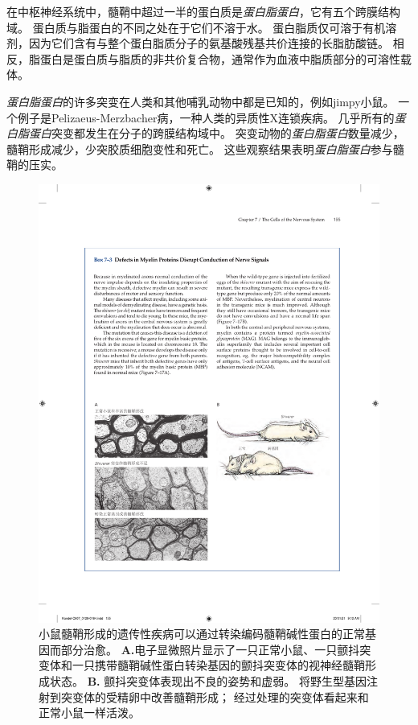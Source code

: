 \begin{proposition}[髓鞘蛋白缺陷破坏神经信号传导]
	\quad \quad 在中枢神经系统中，髓鞘中超过一半的蛋白质是\textit{蛋白脂蛋白}，它有五个跨膜结构域。
	蛋白质与脂蛋白的不同之处在于它们不溶于水。
	蛋白脂质仅可溶于有机溶剂，因为它们含有与整个蛋白脂质分子的氨基酸残基共价连接的长脂肪酸链。
	相反，脂蛋白是蛋白质与脂质的非共价复合物，通常作为血液中脂质部分的可溶性载体。
	
	\quad \quad \textit{蛋白脂蛋白}的许多突变在人类和其他哺乳动物中都是已知的，例如jimpy小鼠。
	一个例子是Pelizaeus-Merzbacher病，一种人类的异质性X连锁疾病。
	几乎所有的\textit{蛋白脂蛋白}突变都发生在分子的跨膜结构域中。
	突变动物的\textit{蛋白脂蛋白}数量减少，髓鞘形成减少，少突胶质细胞变性和死亡。
	这些观察结果表明\textit{蛋白脂蛋白}参与髓鞘的压实。
	
\end{proposition}


\begin{figure}[htbp]
	\centering
	\includegraphics[width=1.0\linewidth]{chap07/fig_7_17}
	\caption{小鼠髓鞘形成的遗传性疾病可以通过转染编码髓鞘碱性蛋白的正常基因而部分治愈。
	\textbf{A.}电子显微照片显示了一只正常小鼠、一只颤抖突变体和一只携带髓鞘碱性蛋白转染基因的颤抖突变体的视神经髓鞘形成状态。
	\textbf{B.} 颤抖突变体表现出不良的姿势和虚弱。
	将野生型基因注射到突变体的受精卵中改善髓鞘形成；
	经过处理的突变体看起来和正常小鼠一样活泼\cite{readhead1987expression}。}
	\label{fig:7_17}
\end{figure}


